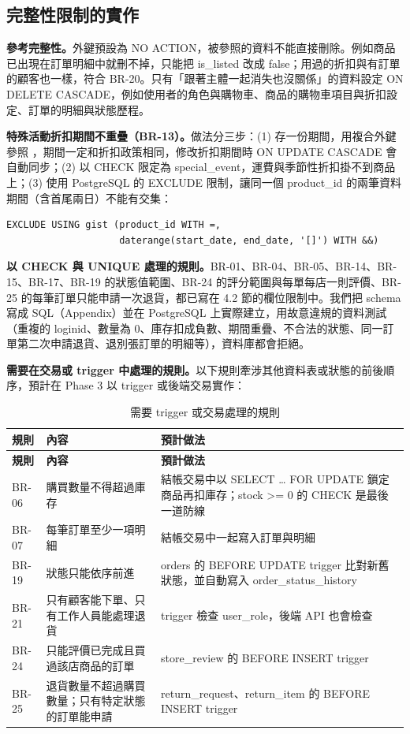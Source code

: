 \subsection{完整性限制的實作}

\textbf{參考完整性。}外鍵預設為 NO ACTION，被參照的資料不能直接刪除。例如商品已出現在訂單明細中就刪不掉，只能把 is\_listed 改成 false；用過的折扣與有訂單的顧客也一樣，符合 BR-20。只有「跟著主體一起消失也沒關係」的資料設定 ON DELETE CASCADE，例如使用者的角色與購物車、商品的購物車項目與折扣設定、訂單的明細與狀態歷程。

\textbf{特殊活動折扣期間不重疊（BR-13）。}做法分三步：(1)  存一份期間，用複合外鍵參照 ，期間一定和折扣政策相同，修改折扣期間時 ON UPDATE CASCADE 會自動同步；(2)  以 CHECK 限定為 special\_event，運費與季節性折扣掛不到商品上；(3) 使用 PostgreSQL 的 EXCLUDE 限制，讓同一個 product\_id 的兩筆資料期間（含首尾兩日）不能有交集：
\begin{Verbatim}[fontsize=\small,xleftmargin=2em]
EXCLUDE USING gist (product_id WITH =,
                    daterange(start_date, end_date, '[]') WITH &&)
\end{Verbatim}

\textbf{以 CHECK 與 UNIQUE 處理的規則。}BR-01、BR-04、BR-05、BR-14、BR-15、BR-17、BR-19 的狀態值範圍、BR-24 的評分範圍與每單每店一則評價、BR-25 的每筆訂單只能申請一次退貨，都已寫在 4.2 節的欄位限制中。我們把 schema 寫成 SQL（Appendix）並在 PostgreSQL 上實際建立，用故意違規的資料測試（重複的 loginid、數量為 0、庫存扣成負數、期間重疊、不合法的狀態、同一訂單第二次申請退貨、退別張訂單的明細等），資料庫都會拒絕。

\textbf{需要在交易或 trigger 中處理的規則。}以下規則牽涉其他資料表或狀態的前後順序，預計在 Phase 3 以 trigger 或後端交易實作：

\begingroup\small
\begin{xltabular}{\linewidth}{|>{\centering\arraybackslash}p{1.6cm}|>{\raggedright\arraybackslash}X|>{\raggedright\arraybackslash}p{5.2cm}|}
\caption{需要 trigger 或交易處理的規則}\\
\hline{}\textbf{規則} & \textbf{內容} & \textbf{預計做法}\\\hline\endfirsthead
\hline{}\textbf{規則} & \textbf{內容} & \textbf{預計做法}\\\hline\endhead
BR-06 & 購買數量不得超過庫存 & 結帳交易中以 SELECT … FOR UPDATE 鎖定商品再扣庫存；stock >= 0 的 CHECK 是最後一道防線\\\hline
BR-07 & 每筆訂單至少一項明細 & 結帳交易中一起寫入訂單與明細\\\hline
BR-19 & 狀態只能依序前進 & orders 的 BEFORE UPDATE trigger 比對新舊狀態，並自動寫入 order\_status\_history\\\hline
BR-21 & 只有顧客能下單、只有工作人員能處理退貨 & trigger 檢查 user\_role，後端 API 也會檢查\\\hline
BR-24 & 只能評價已完成且買過該店商品的訂單 & store\_review 的 BEFORE INSERT trigger\\\hline
BR-25 & 退貨數量不超過購買數量；只有特定狀態的訂單能申請 & return\_request、return\_item 的 BEFORE INSERT trigger\\\hline
\end{xltabular}
\endgroup
